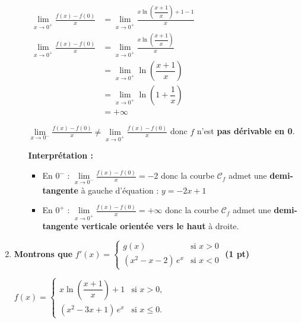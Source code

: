 \documentclass[12pt,a4paper]{article}
\begin{document}
\begin{enumerate}
\begin{enumerate}
        \( 
        \begin{aligned}
            \lim\limits_{x \to 0^+} \frac{f(x) - f(0)}{x}&= \lim\limits_{x \to 0^+} \frac{x \ln\left( \dfrac{x+1}{x} \right)+1-1}{x} \\
            \lim\limits_{x \to 0^+} \frac{f(x) - f(0)}{x}&= \lim\limits_{x \to 0^+} \frac{x \ln\left( \dfrac{x+1}{x} \right)}{x} \\
            &= \lim\limits_{x \to 0^+} \ln\left( \dfrac{x+1}{x} \right) \\
            &= \lim\limits_{x \to 0^+} \ln\left( 1 + \dfrac{1}{x} \right)\\
            &= +\infty
        \end{aligned}
        \)

\(  \lim\limits_{x \to 0^-} \frac{f(x) - f(0)}{x} \neq \lim\limits_{x \to 0^+} \frac{f(x) - f(0)}{x}\) donc \( f \) n’est \textbf{pas dérivable en 0}.

        \textbf{Interprétation :}

\begin{itemize}
    \item En \( 0^- \) : \( \displaystyle \lim\limits_{x \to 0^-} \frac{f(x) - f(0)}{x} = -2 \)  
    donc la courbe \( \mathcal{C}_f \) admet une \textbf{demi-tangente} à gauche d'équation : \( y = -2x + 1 \)

    \item En \( 0^+ \) : \( \displaystyle \lim\limits_{x \to 0^+} \frac{f(x) - f(0)}{x} = +\infty \)  
    donc la courbe \( \mathcal{C}_f \) admet une \textbf{demi-tangente verticale orientée vers le haut} à droite.
\end{itemize}
    \end{enumerate}
\item \textbf{Montrons que } 
\(
f'(x) = 
\begin{cases}
g(x) & \text{si } x > 0 \\
(x^2 - x - 2)\, e^x & \text{si } x < 0
\end{cases}
\) \hfill \textbf{(1 pt)}

\(
    f(x) = 
\begin{cases}
x \ln\left( \dfrac{x+1}{x} \right) + 1 & \text{si } x > 0, \\
(x^2 - 3x + 1)\, e^x & \text{si } x \leq 0.
\end{cases}
\)


\end{enumerate}
\end{document}
